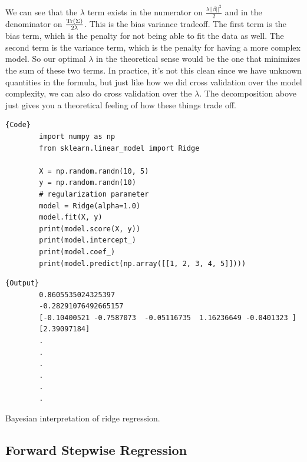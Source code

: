     We can see that the $\lambda$ term exists in the numerator on $\frac{\lambda ||\beta||^2}{2}$ and in the denominator on $\frac{\Tr(\Sigma)}{2 \lambda}$. This is the bias variance tradeoff. The first term is the bias term, which is the penalty for not being able to fit the data as well. The second term is the variance term, which is the penalty for having a more complex model. So our optimal $\lambda$ in the theoretical sense would be the one that minimizes the sum of these two terms. In practice, it's not this clean since we have unknown quantities in the formula, but just like how we did cross validation over the model complexity, we can also do cross validation over the $\lambda$. The decomposition above just gives you a theoretical feeling of how these things trade off. 

    \begin{code}
      \noindent\begin{minipage}{.6\textwidth}
      \begin{lstlisting}[]{Code}
        import numpy as np 
        from sklearn.linear_model import Ridge  

        X = np.random.randn(10, 5) 
        y = np.random.randn(10)
        # regularization parameter
        model = Ridge(alpha=1.0)  
        model.fit(X, y) 
        print(model.score(X, y))  
        print(model.intercept_)
        print(model.coef_) 
        print(model.predict(np.array([[1, 2, 3, 4, 5]]))) 
      \end{lstlisting}
      \end{minipage}
      \hfill
      \begin{minipage}{.39\textwidth}
      \begin{lstlisting}[]{Output}
        0.8605535024325397
        -0.28291076492665157
        [-0.10400521 -0.7587073  -0.05116735  1.16236649 -0.0401323 ]
        [2.39097184]
        .
        .
        .
        .
        .
        .
      \end{lstlisting}
      \end{minipage}
    \end{code}

    \begin{question}[To Do]
      Bayesian interpretation of ridge regression. 
    \end{question}

  \subsection{Forward Stepwise Regression} 

